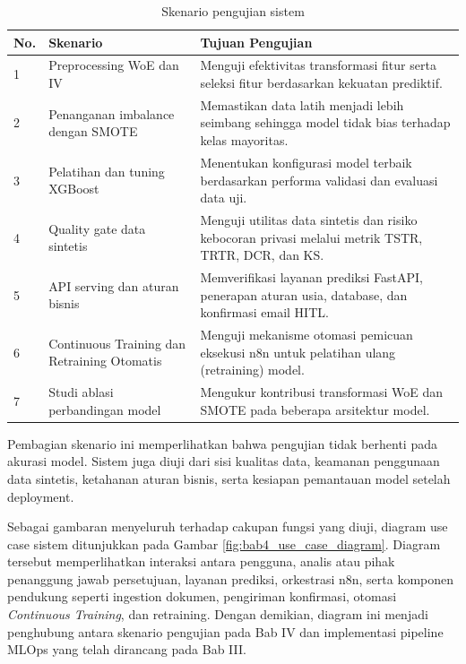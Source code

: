 \begin{table}[H]
\centering
\caption{Skenario pengujian sistem}
\label{tab:bab4_skenario}
\begin{tabular}{|p{}|p{}|p{}|}
\hline
\textbf{No.} & \textbf{Skenario} & \textbf{Tujuan Pengujian} \\
\hline
1 & Preprocessing WoE dan IV & Menguji efektivitas transformasi fitur serta seleksi fitur berdasarkan kekuatan prediktif. \\
\hline
2 & Penanganan imbalance dengan SMOTE & Memastikan data latih menjadi lebih seimbang sehingga model tidak bias terhadap kelas mayoritas. \\
\hline
3 & Pelatihan dan tuning XGBoost & Menentukan konfigurasi model terbaik berdasarkan performa validasi dan evaluasi data uji. \\
\hline
4 & Quality gate data sintetis & Menguji utilitas data sintetis dan risiko kebocoran privasi melalui metrik TSTR, TRTR, DCR, dan KS. \\
\hline
5 & API serving dan aturan bisnis & Memverifikasi layanan prediksi FastAPI, penerapan aturan usia, database, dan konfirmasi email HITL. \\
\hline
6 & Continuous Training dan Retraining Otomatis & Menguji mekanisme otomasi pemicuan eksekusi n8n untuk pelatihan ulang (retraining) model. \\
\hline
7 & Studi ablasi perbandingan model & Mengukur kontribusi transformasi WoE dan SMOTE pada beberapa arsitektur model. \\
\hline
\end{tabular}
\end{table}

Pembagian skenario ini memperlihatkan bahwa pengujian tidak berhenti pada akurasi model. Sistem juga diuji dari sisi kualitas data, keamanan penggunaan data sintetis, ketahanan aturan bisnis, serta kesiapan pemantauan model setelah deployment.

Sebagai gambaran menyeluruh terhadap cakupan fungsi yang diuji, diagram use case sistem ditunjukkan pada Gambar \ref{fig:bab4_use_case_diagram}. Diagram tersebut memperlihatkan interaksi antara pengguna, analis atau pihak penanggung jawab persetujuan, layanan prediksi, orkestrasi n8n, serta komponen pendukung seperti ingestion dokumen, pengiriman konfirmasi, otomasi \textit{Continuous Training}, dan retraining. Dengan demikian, diagram ini menjadi penghubung antara skenario pengujian pada Bab IV dan implementasi pipeline MLOps yang telah dirancang pada Bab III.


